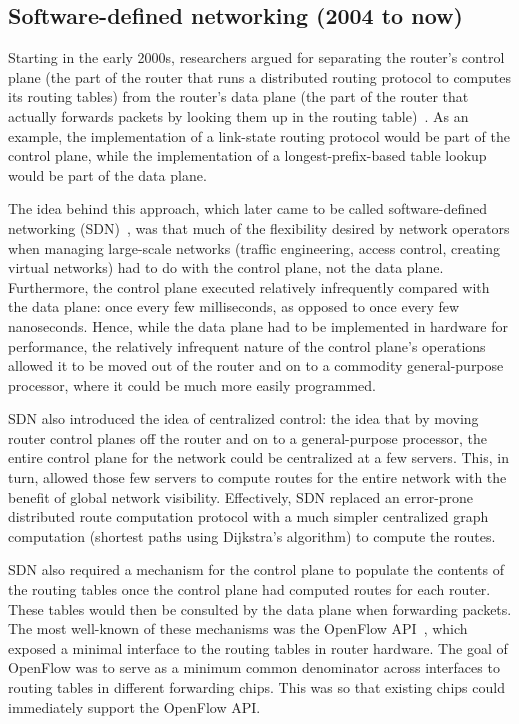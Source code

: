 
\subsection{Software-defined networking (2004 to now)}
Starting in the early 2000s, researchers argued for separating the router's
control plane (\ie the part of the router that runs a distributed routing
protocol to computes its routing tables) from the router's data plane (\ie the
part of the router that actually forwards packets by looking them up in the
routing table)~\cite{route_control, case_for, forces, fourd, ethane}. As an
example, the implementation of a link-state routing protocol would be part of
the control plane, while the implementation of a longest-prefix-based table
lookup would be part of the data plane.

The idea behind this approach, which later came to be called software-defined
networking (SDN)~\cite{sdn_coining}, was that much of the flexibility desired
by network operators when managing large-scale networks (\eg traffic
engineering, access control, creating virtual networks) had to do with the
control plane, not the data plane.  Furthermore, the control plane executed
relatively infrequently compared with the data plane: once every few
milliseconds, as opposed to once every few nanoseconds. Hence, while the data
plane had to be implemented in hardware for performance, the relatively
infrequent nature of the control plane's operations allowed it to be moved out
of the router and on to a commodity general-purpose processor, where it could
be much more easily programmed.

SDN also introduced the idea of centralized control: the idea that by moving
router control planes off the router and on to a general-purpose processor, the
entire control plane for the network could be centralized at a few servers.
This, in turn, allowed those few servers to compute routes for the entire
network with the benefit of global network visibility. Effectively, SDN
replaced an error-prone distributed route computation protocol with a much
simpler centralized graph computation (\eg shortest paths using Dijkstra's
algorithm) to compute the routes.

SDN also required a mechanism for the control plane to populate the contents of
the routing tables once the control plane had computed routes for each router.
These tables would then be consulted by the data plane when forwarding packets.
The most well-known of these mechanisms was the OpenFlow API~\cite{openflow},
which exposed a minimal interface to the routing tables in router hardware.
The goal of OpenFlow was to serve as a minimum common denominator across
interfaces to routing tables in different forwarding chips. This was so that
existing chips could immediately support the OpenFlow API.

